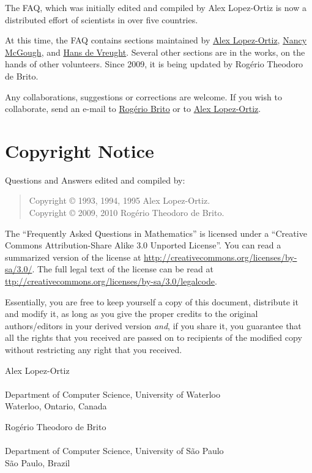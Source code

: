 The \scimath FAQ, which was initially edited and compiled by Alex
Lopez-Ortiz is now a distributed effort of scientists in over five
countries.

At this time, the FAQ contains sections maintained by
\href{mailto:\emailalopez}{Alex Lopez-Ortiz},
\href{mailto:\emailnancy}{Nancy McGough}, and
\href{mailto:\emailhans}{Hans de Vreught}.  Several other sections are
in the works, on the hands of other volunteers. Since 2009, it is being
updated by Rogério Theodoro de Brito.

Any collaborations, suggestions or corrections are welcome. If you wish
to collaborate, send an e-mail to
\href{mailto:\emailrbrito}{Rogério Brito} or to
\href{mailto:\emailalopez}{Alex Lopez-Ortiz}.

\section{Copyright Notice}

Questions and Answers edited and compiled by:

\begin{verse}
  Copyright © 1993, 1994, 1995 Alex Lopez-Ortiz.\\
  Copyright © 2009, 2010 Rogério Theodoro de Brito.
\end{verse}

The \scimath ``Frequently Asked Questions in Mathematics'' is licensed
under a ``Creative Commons Attribution-Share Alike 3.0 Unported
License''.  You can read a summarized version of the license at
\url{http://creativecommons.org/licenses/by-sa/3.0/}.  The full legal
text of the license can be read at
\url{ttp://creativecommons.org/licenses/by-sa/3.0/legalcode}.

Essentially, you are free to keep yourself a copy of this document,
distribute it and modify it, as long as you give the proper credits to
the original authors/editors in your derived version \emph{and}, if you
share it, you guarantee that all the rights that you received are passed
on to recipients of the modified copy without restricting any right that
you received.

\bigskip

\noindent
Alex Lopez-Ortiz\\
\emailalopez\\
Department of Computer Science, University of Waterloo\\
Waterloo, Ontario, Canada

\medskip

\noindent
Rogério Theodoro de Brito\\
\emailrbrito\\
Department of Computer Science, University of São Paulo\\
São Paulo, Brazil
